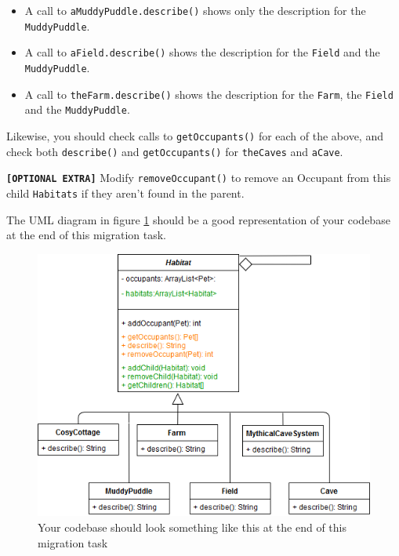 \documentclass[
]{book}
\providecommand{\tightlist}{%
  \setlength{\itemsep}{0pt}\setlength{\parskip}{0pt}}
\begin{document}
\begin{itemize}
\tightlist
\item
  A call to \texttt{aMuddyPuddle.describe()} shows only the description for the \texttt{MuddyPuddle}.
\item
  A call to \texttt{aField.describe()} shows the description for the \texttt{Field} and the \texttt{MuddyPuddle}.
\item
  A call to \texttt{theFarm.describe()} shows the description for the \texttt{Farm}, the \texttt{Field} and the \texttt{MuddyPuddle}.
\end{itemize}

Likewise, you should check calls to \texttt{getOccupants()} for each of the above, and check both \texttt{describe()} and \texttt{getOccupants()} for \texttt{theCaves} and \texttt{aCave}.

\textbf{\texttt{{[}OPTIONAL\ EXTRA{]}}} Modify \texttt{removeOccupant()} to remove an Occupant from this child \texttt{Habitats} if they aren't found in the parent.

The UML diagram in figure \ref{fig:composite-fig} should be a good representation of your codebase at the end of this migration task.

\begin{figure}

{\centering \includegraphics[width=1\linewidth]{images/HabitatComposite} 

}

\caption{Your codebase should look something like this at the end of this migration task}\label{fig:composite-fig}
\end{figure}
\end{document}
